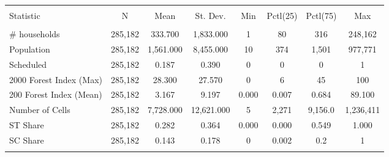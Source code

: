 
\begin{tabular}{@{\extracolsep{5pt}}lccccccc} 
\\[-1.8ex]\hline 
\hline \\[-1.8ex] 
Statistic & \multicolumn{1}{c}{N} & \multicolumn{1}{c}{Mean} & \multicolumn{1}{c}{St. Dev.} & \multicolumn{1}{c}{Min} & \multicolumn{1}{c}{Pctl(25)} & \multicolumn{1}{c}{Pctl(75)} & \multicolumn{1}{c}{Max} \\ 
\hline \\[-1.8ex] 
\# households & 285,182 & 333.700 & 1,833.000 & 1 & 80 & 316 & 248,162 \\ 
Population & 285,182 & 1,561.000 & 8,455.000 & 10 & 374 & 1,501 & 977,771 \\ 
Scheduled & 285,182 & 0.187 & 0.390 & 0 & 0 & 0 & 1 \\ 
2000 Forest Index (Max) & 285,182 & 28.300 & 27.570 & 0 & 6 & 45 & 100 \\ 
200 Forest Index (Mean) & 285,182 & 3.167 & 9.197 & 0.000 & 0.007 & 0.684 & 89.100 \\ 
Number of Cells & 285,182 & 7,728.000 & 12,621.000 & 5 & 2,271 & 9,156.0 & 1,236,411 \\ 
ST Share & 285,182 & 0.282 & 0.364 & 0.000 & 0.000 & 0.549 & 1.000 \\ 
SC Share & 285,182 & 0.143 & 0.178 & 0 & 0.002 & 0.2 & 1 \\ 
\hline \\[-1.8ex] 
\end{tabular} 
